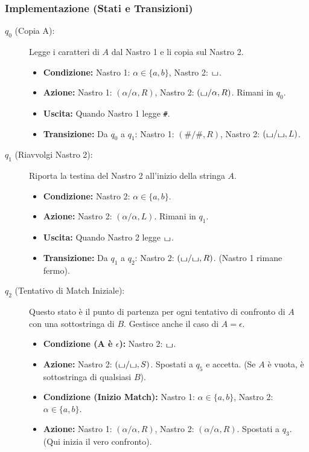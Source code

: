 \documentclass[a4paper]{article}
\theoremstyle{definition} %
\newcommand{\blankS}{\ensuremath{\raisebox{-0.15ex}{\scalebox{1.3}[0.7]{$\sqcup$}}}}
\begin{document}
\subsubsection{Implementazione (Stati e Transizioni)}
\begin{description}
    \item[$q_0$ (Copia A):] Legge i caratteri di $A$ dal Nastro 1 e li copia sul Nastro 2.
    \begin{itemize}
        \item \textbf{Condizione:} Nastro 1: $\alpha \in \{a,b\}$, Nastro 2: $\blankS$.
        \item \textbf{Azione:} Nastro 1: $(\alpha/\alpha, R)$, Nastro 2: $(\blankS/\alpha, R)$. Rimani in $q_0$.
        \item \textbf{Uscita:} Quando Nastro 1 legge \texttt{\#}.
        \item \textbf{Transizione:} Da $q_0$ a $q_1$: Nastro 1: $(\#/\#, R)$, Nastro 2: $(\blankS/\blankS, L)$.
    \end{itemize}
    \item[$q_1$ (Riavvolgi Nastro 2):] Riporta la testina del Nastro 2 all'inizio della stringa $A$.
    \begin{itemize}
        \item \textbf{Condizione:} Nastro 2: $\alpha \in \{a,b\}$.
        \item \textbf{Azione:} Nastro 2: $(\alpha/\alpha, L)$. Rimani in $q_1$.
        \item \textbf{Uscita:} Quando Nastro 2 legge $\blankS$.
        \item \textbf{Transizione:} Da $q_1$ a $q_2$: Nastro 2: $(\blankS/\blankS, R)$. (Nastro 1 rimane fermo).
    \end{itemize}
    \item[$q_2$ (Tentativo di Match Iniziale):] Questo stato è il punto di partenza per ogni tentativo di confronto di $A$ con una sottostringa di $B$. Gestisce anche il caso di $A = \epsilon$.
    \begin{itemize}
        \item \textbf{Condizione (A è $\epsilon$):} Nastro 2: $\blankS$.
        \item \textbf{Azione:} Nastro 2: $(\blankS/\blankS, S)$. Spostati a $q_5$ e accetta. (Se $A$ è vuota, è sottostringa di qualsiasi $B$).
        \item \textbf{Condizione (Inizio Match):} Nastro 1: $\alpha \in \{a,b\}$, Nastro 2: $\alpha \in \{a,b\}$.
        \item \textbf{Azione:} Nastro 1: $(\alpha/\alpha, R)$, Nastro 2: $(\alpha/\alpha, R)$. Spostati a $q_3$. (Qui inizia il vero confronto).

\end{itemize}
\end{description}
\end{document}
